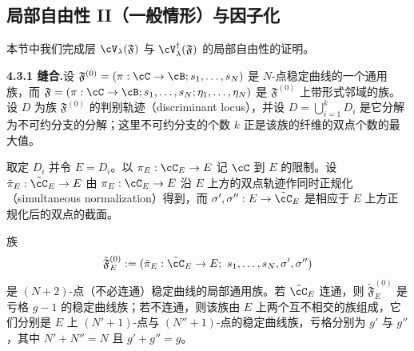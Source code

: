 \subsection{局部自由性 II（一般情形）与因子化}

本节中我们完成层 $\cV_\lambda(\mathfrak F)$ 与 $\cV^{\dagger}_\lambda(\mathfrak F)$ 的局部自由性的证明。


\noindent\textbf{4.3.1 缝合.}\quad 设 $\mathfrak F^{(0)}=(\pi:\cC\to\cB;s_1,\dots,s_N)$ 是 $N$-点稳定曲线的一个通用族，而 $\mathfrak F=(\pi:\cC\to\cB;s_1,\dots,s_N;\eta_1,\dots,\eta_N)$ 是 $\mathfrak F^{(0)}$ 上带形式邻域的族。设 $D$ 为族 $\mathfrak F^{(0)}$ 的判别轨迹（discriminant locus），并设 $D=\bigcup_{i=1}^{k}D_i$ 是它分解为不可约分支的分解；这里不可约分支的个数 $k$ 正是该族的纤维的双点个数的最大值。

取定 $D_i$ 并令 $E=D_i$。以 $\pi_E:\cC_E\to E$ 记 $\cC$ 到 $E$ 的限制。设 $\tilde\pi_E:\tilde\cC_E\to E$ 由 $\pi_E:\cC_E\to E$ 沿 $E$ 上方的双点轨迹作同时正规化（simultaneous normalization）得到，而 $\sigma',\sigma'':E\to\tilde\cC_E$ 是相应于 $E$ 上方正规化后的双点的截面。



\begin{proposition}[4.13]
族
\[
 \tilde{\mathfrak F}^{(0)}_E:=(\tilde\pi_E:\tilde\cC_E\to E;\ s_1,\dots,s_N,\sigma',\sigma'')
\]
是 $(N+2)$-点（不必连通）稳定曲线的局部通用族。若 $\tilde\cC_E$ 连通，则 $\tilde{\mathfrak F}^{(0)}_E$ 是亏格 $g-1$ 的稳定曲线族；若不连通，则该族由 $E$ 上两个互不相交的族组成，它们分别是 $E$ 上 $(N'+1)$-点与 $(N''+1)$-点的稳定曲线族，亏格分别为 $g'$ 与 $g''$，其中 $N'+N''=N$ 且 $g'+g''=g$。
\end{proposition}


